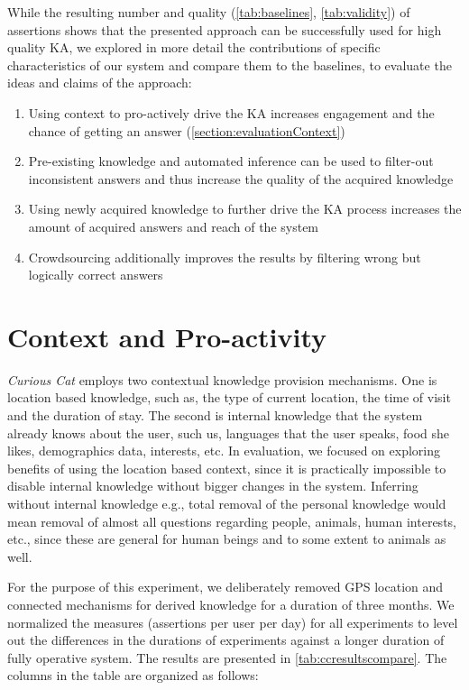 While the resulting number and quality (\autoref{tab:baselines}, 
\autoref{tab:validity}) of assertions
shows that the presented approach can be successfully used for high quality KA,
we explored in more detail the contributions of specific characteristics of our
system and compare them to the baselines, to evaluate the ideas and claims
of the approach:
\begin{enumerate}
\item Using context to pro-actively drive the KA increases engagement and the 
chance of getting an answer (\autoref{section:evaluationContext})
\item Pre-existing knowledge and automated inference can be used to filter-out 
inconsistent answers and thus increase the quality of the acquired knowledge
\item Using newly acquired knowledge to further drive the KA process increases
the amount of acquired answers and reach of the system
\item Crowdsourcing additionally improves the results by filtering wrong but 
logically correct answers
\end{enumerate}

\section{Context and Pro-activity}
\label{section:evaluationContext}
\emph{Curious Cat} employs two contextual knowledge provision mechanisms. One 
is location based knowledge, such as, the type of current location, the time of
visit and the duration of stay. The second is internal knowledge that the 
system already knows about the user, such us, languages that the user speaks, 
food she likes, demographics data, interests, etc. In evaluation, we focused on
exploring benefits of using the location based context, since it is practically
impossible to disable internal knowledge without bigger changes in the system. 
Inferring without internal knowledge e.g., total removal of the personal 
knowledge would mean removal of almost all questions regarding people, animals,
human interests, etc., since these are general for human beings and to some 
extent to animals as well.

For the purpose of this experiment, we deliberately removed GPS location and 
connected mechanisms for derived knowledge for a duration of three months. We 
normalized the measures (assertions per user per day) for all experiments to 
level out the differences in the durations of experiments against a longer 
duration of fully operative system. The results are presented in 
\autoref{tab:ccresultscompare}. The columns in the table are organized as 
follows:

